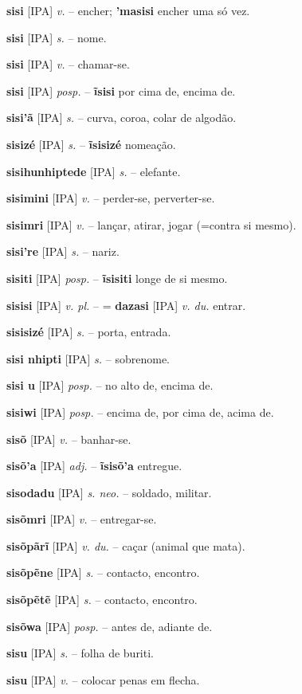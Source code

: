 \textbf{sisi} [IPA] \textit{v.} -- encher; \textbf{'masisi} encher uma só vez.

\textbf{sisi} [IPA] \textit{s.} -- nome.

\textbf{sisi} [IPA] \textit{v.} -- chamar-se.

\textbf{sisi} [IPA] \textit{posp.} -- \textbf{ĩsisi} por cima de, encima de.

\textbf{sisi'ã} [IPA] \textit{s.} -- curva, coroa, colar de algodão.

\textbf{sisizé} [IPA] \textit{s.} -- \textbf{ĩsisizé} nomeação.

\textbf{sisihunhiptede} [IPA] \textit{s.} -- elefante.

\textbf{sisimini} [IPA] \textit{v.} -- perder-se, perverter-se.

\textbf{sisimri} [IPA] \textit{v.} -- lançar, atirar, jogar (=contra si mesmo).

\textbf{sisi're} [IPA] \textit{s.} -- nariz.

\textbf{sisiti} [IPA] \textit{posp.} -- \textbf{ĩsisiti} longe de si mesmo.

\textbf{sisisi} [IPA] \textit{v. pl.} -- = \textbf{dazasi} [IPA] \textit{v. du.} entrar.

\textbf{sisisizé} [IPA] \textit{s.} -- porta, entrada.

\textbf{sisi nhipti} [IPA] \textit{s.} -- sobrenome.

\textbf{sisi u} [IPA] \textit{posp.} -- no alto de, encima de.

\textbf{sisiwi} [IPA] \textit{posp.} -- encima de, por cima de, acima de.

\textbf{sisõ} [IPA] \textit{v.} -- banhar-se.

\textbf{sisõ'a} [IPA] \textit{adj.} -- \textbf{ĩsisõ'a} entregue.

\textbf{sisodadu} [IPA] \textit{s. neo.} -- soldado, militar.

\textbf{sisõmri} [IPA] \textit{v.} -- entregar-se.

\textbf{sisõpãrĩ} [IPA] \textit{v. du.} -- caçar (animal que mata).

\textbf{sisõpẽne} [IPA] \textit{s.} -- contacto, encontro.

\textbf{sisõpẽtẽ} [IPA] \textit{s.} -- contacto, encontro.

\textbf{sisõwa} [IPA] \textit{posp.} -- antes de, adiante de.

\textbf{sisu} [IPA] \textit{s.} -- folha de buriti.

\textbf{sisu} [IPA] \textit{v.} -- colocar penas em flecha.

